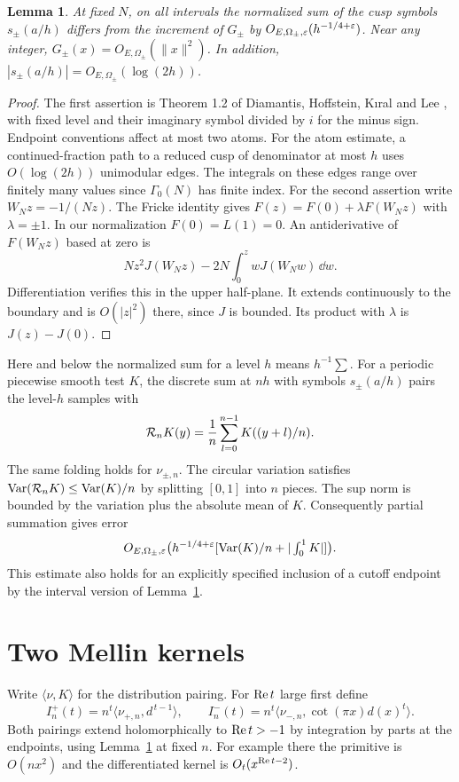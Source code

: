 \documentclass[11pt]{article}
\newtheorem{lemma}[theorem]{Lemma}
\begin{document}
\begin{lemma}\label{lem:dist}
At fixed \(N\), on all intervals the normalized sum of the cusp symbols
\(s_\pm(a/h)\) differs from the increment of \(G_\pm\) by
\(O_{E,\Omega_\pm,\varepsilon}(h^{-1/4+\varepsilon})\). Near any integer,
\(G_\pm(x)=O_{E,\Omega_\pm}(\|x\|^2)\). In addition,
\(|s_\pm(a/h)|=O_{E,\Omega_\pm}(\log(2h))\).
\end{lemma}
\begin{proof}
The first assertion is Theorem 1.2 of Diamantis, Hoffstein, K{\i}ral and
Lee \cite{DHKL}, with fixed level and their imaginary symbol divided by
\(i\) for the minus sign. Endpoint conventions affect at most two atoms.
For the atom estimate, a continued-fraction path to a reduced cusp of
denominator at most \(h\) uses \(O(\log(2h))\) unimodular edges. The
integrals on these edges range over finitely many values since
\(\Gamma_0(N)\) has finite index. For the second assertion write
\(W_Nz=-1/(Nz)\). The Fricke identity gives
\(F(z)=F(0)+\lambda F(W_Nz)\) with \(\lambda=\pm1\).
In our normalization \(F(0)=L(1)=0\). An antiderivative of \(F(W_Nz)\)
based at zero is
\[
 Nz^2 J(W_Nz)-2N\int_0^z wJ(W_Nw)\,\dd w.
\]
Differentiation verifies this in the upper half-plane. It extends
continuously to the boundary and is \(O(|z|^2)\) there, since \(J\)
is bounded. Its product with \(\lambda\) is \(J(z)-J(0)\).
\end{proof}

Here and below the normalized sum for a level \(h\) means \(h^{-1}\sum\).
For a periodic piecewise smooth test \(K\), the discrete sum at \(nh\)
with symbols \(s_\pm(a/h)\) pairs the level-\(h\) samples with
\[
 {\cal R}_nK(y)=\frac1n\sum_{l=0}^{n-1}K((y+l)/n).
\]
The same folding holds for \(\nu_{\pm,n}\).
The circular variation satisfies \(\operatorname{Var}({\cal R}_nK)
\le\operatorname{Var}(K)/n\) by splitting \([0,1]\) into \(n\) pieces.
The sup norm is bounded by the variation plus the absolute mean of \(K\).
Consequently partial summation gives error
\begin{equation}\label{eq:fold}
 O_{E,\Omega_\pm,\varepsilon}\bigl(h^{-1/4+\varepsilon}
      [\operatorname{Var}(K)/n+|\textstyle\int_0^1 K|]\bigr).
\end{equation}
This estimate also holds for an explicitly specified inclusion of a cutoff
endpoint by the interval version of Lemma~\ref{lem:dist}.

\section{Two Mellin kernels}
Write \(\langle\nu,K\rangle\) for the distribution pairing.
For \(\operatorname{Re} t\) large first define
\[
 I_n^+(t)=n^t\langle\nu_{+,n},d^{\,t-1}\rangle,\qquad
 I_n^-(t)=n^t\langle\nu_{-,n},\cot(\pi x)d(x)^t\rangle .
\]
Both pairings extend holomorphically to \(\operatorname{Re} t>-1\) by integration
by parts at the endpoints, using Lemma~\ref{lem:dist} at fixed \(n\).
For example there the primitive is \(O(n x^2)\) and the differentiated
kernel is \(O_t(x^{\operatorname{Re} t-2})\).
\end{document}
